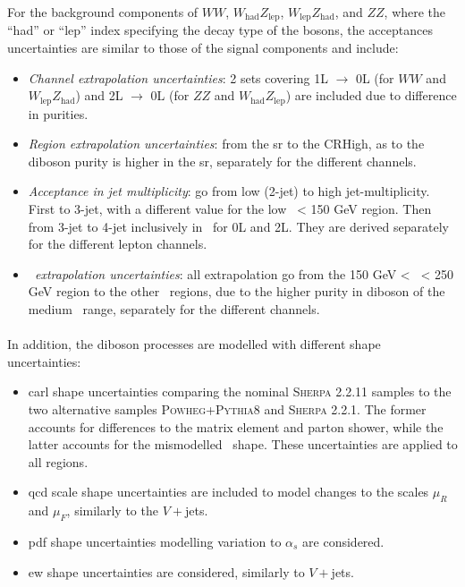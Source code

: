 For the background components of $WW$, $W_{\text{had}}Z_{\text{lep}}$, $W_{\text{lep}}Z_{\text{had}}$, and $ZZ$, where the ``had'' or ``lep'' index specifying the decay type of the bosons, the acceptances uncertainties are similar to those of the signal components and include:
\begin{itemize}[leftmargin=*]
    \item \textit{Channel extrapolation uncertainties}: 2 sets covering 1L $\rightarrow$ 0L (for $WW$ and $W_{\text{lep}}Z_{\text{had}}$) and 2L $\rightarrow$ 0L (for $ZZ$ and $W_{\text{had}}Z_{\text{lep}}$) are included due to difference in purities.
    \item \textit{Region extrapolation uncertainties}: from the \gls{sr} to the CRHigh, as to the diboson purity is higher in the \gls{sr}, separately for the different channels.
    \item \textit{Acceptance in jet multiplicity}: go from low (2-jet) to high jet-multiplicity. First to 3-jet, with a different value for the low \ptv\ < 150 GeV region. Then from 3-jet to 4-jet inclusively in \ptv\ for 0L and 2L. They are derived separately for the different lepton channels. 
    \item \textit{\ptv\ extrapolation uncertainties}: all extrapolation go from the 150 GeV < \ptv\ < 250 GeV region to the other \ptv\ regions, due to the higher purity in diboson of the medium \ptv\ range, separately for the different channels.
\end{itemize}

\paragraph{}In addition, the diboson processes are modelled with different shape uncertainties:
\begin{itemize}[leftmargin=*]
    \item \gls{carl} shape uncertainties comparing the nominal \textsc{Sherpa} 2.2.11 samples to the two alternative samples \textsc{Powheg}+\textsc{Pythia}8 and \textsc{Sherpa} 2.2.1. The former accounts for differences to the matrix element and parton shower, while the latter accounts for the mismodelled \ptv\ shape. These uncertainties are applied to all regions.
    \item \gls{qcd} scale shape uncertainties are included to model changes to the scales $\mu_R$ and $\mu_F$, similarly to the $V+$jets.
    \item \gls{pdf} shape uncertainties modelling variation to $\alpha_s$ are considered.
    \item \gls{ew} shape uncertainties are considered, similarly to $V+$jets.
\end{itemize}

